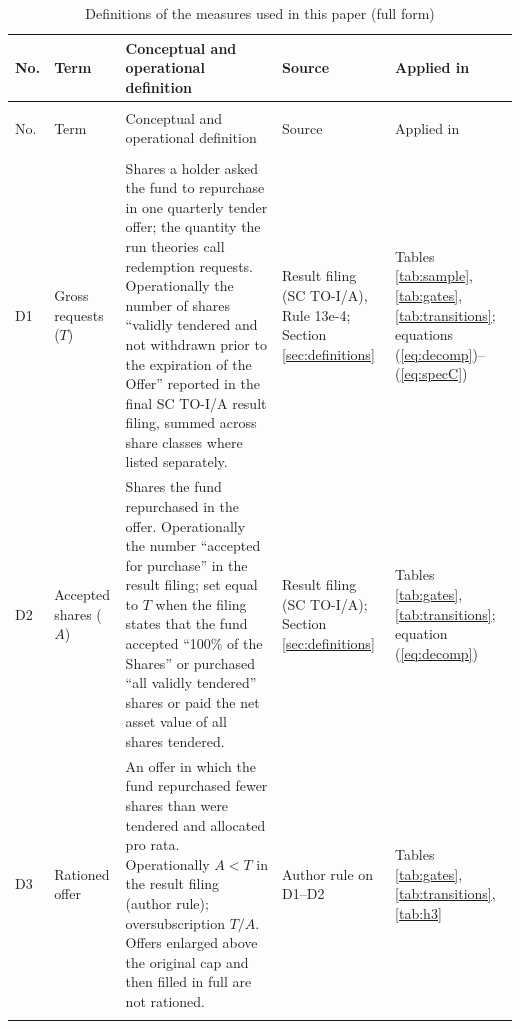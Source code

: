 \begin{longtable}{>{\raggedright\arraybackslash}p{}>{\raggedright\arraybackslash}p{}>{\raggedright\arraybackslash}p{}>{\raggedright\arraybackslash}p{}>{\raggedright\arraybackslash}p{}}
\caption{Definitions of the measures used in this paper (full form)}\label{tab:defs_full}\\
\toprule No. & Term & Conceptual and operational definition & Source & Applied in \\ \midrule \endfirsthead
\multicolumn{5}{l}{\footnotesize Table~\thetable\ (continued)}\\ \toprule No. & Term & Conceptual and operational definition & Source & Applied in \\ \midrule \endhead
\midrule\multicolumn{5}{r}{\footnotesize continued on next page}\\ \endfoot
\bottomrule \endlastfoot
D1 & Gross requests ($T$) & Shares a holder asked the fund to repurchase in one quarterly tender offer; the quantity the run theories call redemption requests. Operationally the number of shares ``validly tendered and not withdrawn prior to the expiration of the Offer'' reported in the final SC TO-I/A result filing, summed across share classes where listed separately. & Result filing (SC TO-I/A), Rule 13e-4; Section \ref{sec:definitions} & Tables \ref{tab:sample}, \ref{tab:gates}, \ref{tab:transitions}; equations (\ref{eq:decomp})--(\ref{eq:specC}) \\ \addlinespace[2pt]
D2 & Accepted shares ($A$) & Shares the fund repurchased in the offer. Operationally the number ``accepted for purchase'' in the result filing; set equal to $T$ when the filing states that the fund accepted ``100\% of the Shares'' or purchased ``all validly tendered'' shares or paid the net asset value of all shares tendered. & Result filing (SC TO-I/A); Section \ref{sec:definitions} & Tables \ref{tab:gates}, \ref{tab:transitions}; equation (\ref{eq:decomp}) \\ \addlinespace[2pt]
D3 & Rationed offer & An offer in which the fund repurchased fewer shares than were tendered and allocated pro rata. Operationally $A<T$ in the result filing (author rule); oversubscription $T/A$. Offers enlarged above the original cap and then filled in full are not rationed. & Author rule on D1--D2 & Tables \ref{tab:gates}, \ref{tab:transitions}, \ref{tab:h3} \\ \addlinespace[2pt]

\end{longtable}
